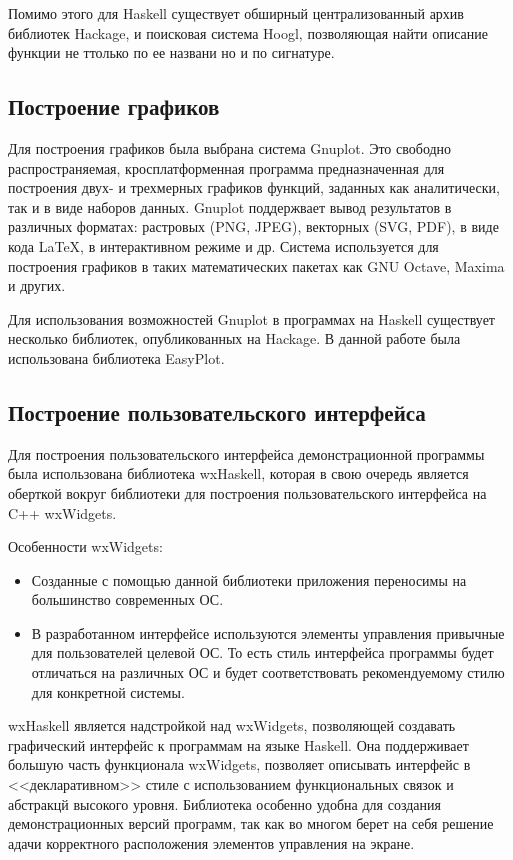 Помимо этого для Haskell существует обширный централизованный архив библиотек Hackage\cite{hackage}, и поисковая система Hoogl\cite{hoogle}, позволяющая найти описание функции не ттолько по ее названи но и по сигнатуре.

\subsection{Построение графиков}

Для построения графиков была выбрана система Gnuplot\cite{gnuplot}. Это свободно распространяемая, кросплатформенная программа предназначенная для построения двух- и трехмерных графиков функций, заданных как аналитически, так и в виде наборов данных. Gnuplot поддержвает вывод результатов в различных форматах: растровых (PNG, JPEG), векторных (SVG, PDF), в виде кода LaTeX, в интерактивном режиме и др. Система используется для построения графиков в таких математических пакетах как GNU Octave, Maxima и других.

Для использования возможностей Gnuplot в программах на Haskell существует несколько библиотек, опубликованных на Hackage. В данной работе была использована библиотека EasyPlot.


\subsection{Построение пользовательского интерфейса}

Для построения пользовательского интерфейса демонстрационной программы была использована библиотека wxHaskell\cite{wxhaskell}, которая в свою очередь является оберткой вокруг библиотеки для построения пользовательского интерфейса на C++ wxWidgets. 

Особенности wxWidgets:

\begin{itemize}
\item Созданные с помощью данной библиотеки приложения переносимы на большинство современных ОС.

\item В разработанном интерфейсе используются элементы управления привычные для пользователей целевой ОС. То есть стиль интерфейса программы будет отличаться на различных ОС и будет соответствовать рекомендуемому стилю для конкретной системы.

\end{itemize}

wxHaskell является надстройкой над wxWidgets, позволяющей создавать графический интерфейс к программам на языке Haskell. Она поддерживает большую часть функционала wxWidgets, позволяет описывать интерфейс в <<декларативном>> стиле с использованием функциональных связок и абстракцй высокого уровня. Библиотека особенно удобна для создания демонстрационных версий программ, так как во многом берет на себя решение адачи корректного расположения элементов управления на экране. 

